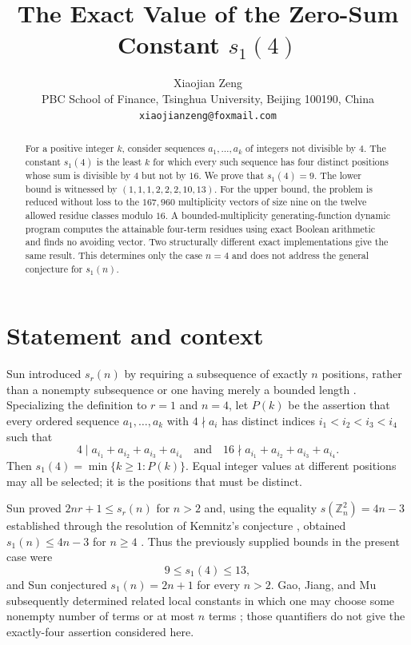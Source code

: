 \documentclass[11pt]{article}
\title{The Exact Value of the Zero-Sum Constant $s_1(4)$}
\author{Xiaojian Zeng\\
PBC School of Finance, Tsinghua University, Beijing 100190, China\\
\texttt{xiaojianzeng@foxmail.com}}
\date{}
\newcommand{\Z}{\mathbb Z}
\begin{document}
\maketitle

\begin{abstract}
For a positive integer $k$, consider sequences $a_1,\ldots,a_k$ of
integers not divisible by $4$.  The constant $s_1(4)$ is the least $k$
for which every such sequence has four distinct positions whose sum is
divisible by $4$ but not by $16$.  We prove that $s_1(4)=9$.  The lower
bound is witnessed by $(1,1,1,2,2,2,10,13)$.  For the upper bound, the
problem is reduced without loss to the $167{,}960$ multiplicity vectors
of size nine on the twelve allowed residue classes modulo $16$.  A
bounded-multiplicity generating-function dynamic program computes the
attainable four-term residues using exact Boolean arithmetic and finds no
avoiding vector.  Two structurally different exact implementations give
the same result.  This determines only the case $n=4$ and does not address
the general conjecture for $s_1(n)$.
\end{abstract}

\section{Statement and context}

Sun introduced $s_r(n)$ by requiring a subsequence of exactly $n$
positions, rather than a nonempty subsequence or one having merely a
bounded length \cite{Sun2026ZeroSum}.  Specializing the definition to
$r=1$ and $n=4$, let $P(k)$ be the assertion that every ordered sequence
$a_1,\ldots,a_k$ with $4\nmid a_i$ has distinct indices
$i_1<i_2<i_3<i_4$ such that
\[
  4\mid a_{i_1}+a_{i_2}+a_{i_3}+a_{i_4}
  \quad\text{and}\quad
  16\nmid a_{i_1}+a_{i_2}+a_{i_3}+a_{i_4}.
\]
Then $s_1(4)=\min\{k\geq 1:P(k)\}$.  Equal integer values at different
positions may all be selected; it is the positions that must be distinct.

Sun proved $2nr+1\leq s_r(n)$ for $n>2$ and, using the equality
$s(\Z_n^2)=4n-3$ established through the resolution of Kemnitz's
conjecture \cite{Reiher2007Kemnitz}, obtained $s_1(n)\leq 4n-3$ for
$n\geq4$ \cite{Sun2026ZeroSum}.  Thus the previously supplied bounds in
the present case were
\[
  9\leq s_1(4)\leq13,
\]
and Sun conjectured $s_1(n)=2n+1$ for every $n>2$.  Gao, Jiang, and Mu
subsequently determined related local constants in which one may choose
some nonempty number of terms or at most $n$ terms
\cite{GaoJiangMu2026Local}; those quantifiers do not give the
exactly-four assertion considered here.
\end{document}
